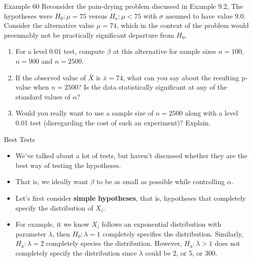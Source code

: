 \documentclass[
  ignorenonframetext,
]{beamer}
\providecommand{\tightlist}{%
  \setlength{\itemsep}{0pt}\setlength{\parskip}{0pt}}\usepackage{longtable,booktabs,array}
\begin{document}
\begin{frame}{Example 60}
\protect\hypertarget{example-60}{}
Reconsider the pain-drying problem discussed in Example 9.2, The
hypotheses were \(H_{0}: \mu = 75\) versus \(H_{a}: \mu < 75\) with
\(\sigma\) assumed to have value 9.0. Consider the alternative value
\(\mu = 74\), which in the context of the problem would presumably not
be practically significant departure from \(H_{0}\).

\begin{enumerate}[<+->]
[a.]
\tightlist
\item
  For a level 0.01 test, compute \(\beta\) at this alternative for
  sample sizes \(n=100\), \(n=900\) and \(n=2500\).
\item
  If the observed value of \(\bar{X}\) is \(\bar{x} = 74\), what can you
  say about the resulting p-value when \(n=2500\)? Is the data
  statistically significant at any of the standard values of \(\alpha\)?
\item
  Would you really want to use a sample size of \(n=2500\) along with a
  level 0.01 test (disregarding the cost of such an experiment)?
  Explain.
\end{enumerate}
\end{frame}

\begin{frame}{Best Tests}
\protect\hypertarget{best-tests}{}
\begin{itemize}[<+->]
\tightlist
\item
  We've talked about a lot of tests, but haven't discussed whether they
  are the best way of testing the hypotheses.
\item
  That is, we ideally want \(\beta\) to be as small as possible while
  controlling \(\alpha\).
\item
  Let's first consider \textbf{simple hypotheses}, that is, hypotheses
  that completely specify the distribution of \(X_{i}\).
\item
  For example, it we know \(X_{i}\) follows an exponential distribution
  with parameter \(\lambda\), then \(H_{0}: \lambda = 1\) completely
  specifies the distribution. Similarly, \(H_{a}: \lambda = 2\)
  completely species the distribution. However, \(H_{a}: \lambda > 1\)
  does not completely specify the distribution since \(\lambda\) could
  be 2, or 5, or 300.
\end{itemize}
\end{frame}
\end{document}
